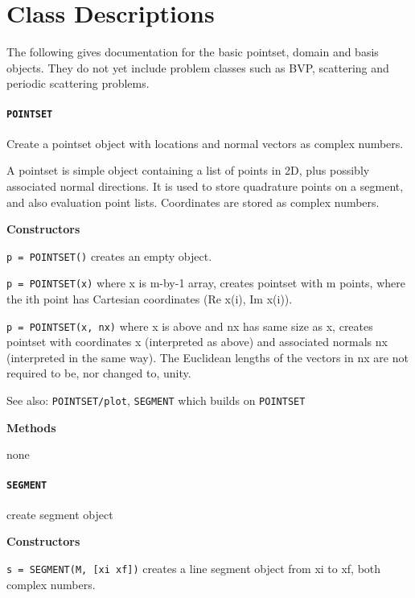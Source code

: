 \appendix

\setlength{\parskip}{\baselineskip}
\setlength{\parindent}{0pt}

\section{Class Descriptions}

The following gives documentation for the basic pointset, domain and
basis objects.
They do not yet include problem classes such as BVP,
scattering and periodic scattering problems.


\paragraph{\tt POINTSET}

Create a pointset object with locations and normal vectors as
complex numbers.

A pointset is simple object containing a list of points in 2D, plus possibly
associated normal directions.  It is used to store quadrature points on a
segment, and also evaluation point lists. Coordinates are stored as 
complex numbers.

\textbf{Constructors}

{\tt p = POINTSET()}
creates an empty object.
 
{\tt p = POINTSET(x)} where x is m-by-1 array, creates pointset with m points, where
the ith point has Cartesian coordinates (Re x(i), Im x(i)).
  
{\tt p = POINTSET(x, nx)} where x is above and nx has same size as x, creates
pointset with coordinates x (interpreted as above) and associated normals
nx (interpreted in the same way). The Euclidean lengths of the vectors in
nx are not required to be, nor changed to, unity.

See also: {\tt POINTSET/plot}, {\tt SEGMENT} which builds on {\tt POINTSET}

\textbf{Methods}

none


\newpage

\paragraph{\tt SEGMENT} create segment object

\textbf{Constructors}

{\tt s = SEGMENT(M, [xi xf])}  creates a line segment object from xi to xf, both
complex numbers.

